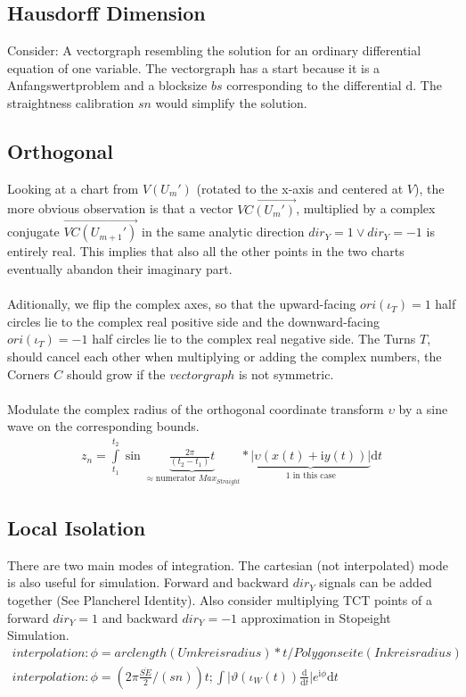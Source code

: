 \documentclass{report}
\begin{document}
\subsection{Hausdorff Dimension}
Consider: A vectorgraph resembling the solution for an ordinary differential equation of one variable. The vectorgraph has a start because it is a Anfangswertproblem and a blocksize $bs$ corresponding to the differential $\mathrm{d}$. The straightness calibration $sn$ would simplify the solution.


\subsection{Orthogonal}
Looking at a chart from $V(U_{m}')$ (rotated to the x-axis and centered at $V$), the more obvious observation is that a vector $\overrightarrow{VC(U_{m}')}$, multiplied by a complex conjugate $\overrightarrow{VC(U_{m+1}')}$ in the same analytic direction $dir_{Y}=1\lor dir_{Y}=-1$ is entirely real. This implies that also all the other points in the two charts eventually abandon their imaginary part.\\\\
Aditionally, we flip the complex axes, so that the upward-facing $ori(\iota_{T})=1$ half circles lie to the complex real positive side and the downward-facing $ori(\iota_{T})=-1$ half circles lie to the complex real negative side. The Turns $T$, should cancel each other when multiplying or adding the complex numbers, the Corners $C$ should grow if the $vectorgraph$ is not symmetric.\\\\
Modulate the complex radius of the orthogonal coordinate transform $\upsilon$ by a sine wave on the corresponding bounds.
\begin{align}
z_{n} = \int \limits _{t_{1}}^{t_{2}} \sin \underbrace{\frac{2\pi}{(t_{2}-t_{1})}t}_{\approx \text{numerator }Max_{Straight}} * \underbrace{\lvert \upsilon (x(t)+\mathrm{i}y(t)) \rvert}_{1\text{ in this case}} \mathrm{d}t \label{eq:4}
\end{align}

\subsection{Local Isolation}
There are two main modes of integration. The cartesian (not interpolated) mode is also useful for simulation. Forward and backward $dir_{Y}$ signals can be added together (See Plancherel Identity). Also consider multiplying TCT points of a forward $dir_{Y}=1$ and backward $dir_{Y}=-1$ approximation in Stopeight Simulation.
\begin{align}
interpolation: \phi = arclength(Umkreisradius)*t/Polygonseite(Inkreisradius)\\
interpolation: \phi = (2\pi\frac{\overline{SE}}{2}/(sn))t;\int \lvert \vartheta (\iota_{W} (t))\frac{\mathrm{d}}{\mathrm{d}t} \rvert e^{\mathrm{i}\phi}\mathrm{d}t
\end{align}
\end{document}
